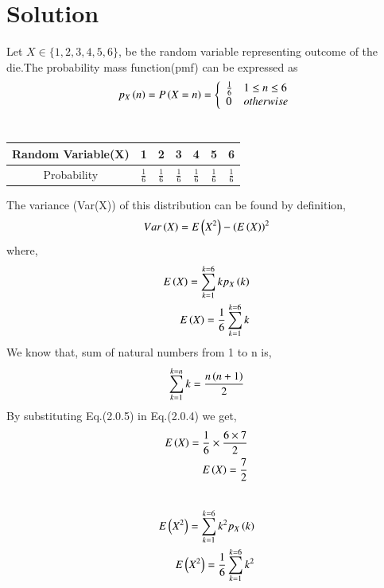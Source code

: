 \documentclass[journal,12pt,twocolumn]{IEEEtran}
\begin{document}
\section{Solution}
Let $X \in \{1,2,3,4,5,6\}$, be the random variable representing outcome of the die.The probability mass function(pmf) can be expressed as
\begin{align}
p_X\left(n\right) = P\left(X=n\right) =    \left\{
                  \begin{array}{ll}
                      \frac{1}{6} & 1 \leq n \leq 6 \\
                      0 & otherwise \\
                  \end{array} 
                  \right.    
\end{align}
\\
\begin{center}
\begin{tabular}{ |c|c|c|c|c|c|c| } 
 \hline
 Random Variable(X) & 1 & 2 & 3 & 4 & 5 & 6 \\ 
 \hline
 Probability & $\frac{1}{6}$ & $\frac{1}{6}$ & $\frac{1}{6}$ & $\frac{1}{6}$ & $\frac{1}{6}$ & $\frac{1}{6}$ \\
 \hline
\end{tabular}
\end{center}
The variance (Var(X)) of this distribution can be found by definition,\\
\begin{align}
Var\left(X\right) = E\left(X^{2}\right)-\left(E\left(X\right)\right)^{2}
\end{align}
where,
\begin{align}
E\left(X\right)=\sum_{k=1}^{k=6} kp_X\left(k\right)\\
E\left(X\right)=\frac{1}{6}\sum_{k=1}^{k=6} k
\end{align}
We know that, sum of natural numbers from 1 to n is,
\begin{align}
\sum_{k=1}^{k=n} k = \frac{n\left(n+1\right)}{2}
\end{align}
By substituting Eq.(2.0.5) in Eq.(2.0.4) we get,
\begin{align}
E\left(X\right)=\frac{1}{6} \times \frac{6\times7}{2}\\
E\left(X\right)=\frac{7}{2}
\end{align}
\\
\begin{align}
E\left(X^{2}\right)=\sum_{k=1}^{k=6} k^{2}p_X\left(k\right)\\
E\left(X^{2}\right)=\frac{1}{6}\sum_{k=1}^{k=6} k^{2}
\end{align}
\end{document}
